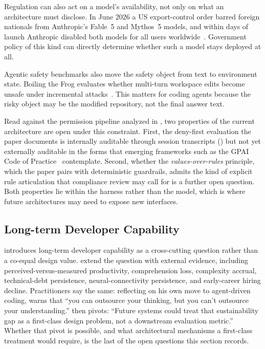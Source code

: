 \tierA{} Regulation can also act on a model's availability, not only on what an architecture must disclose. In June 2026 a US export-control order barred foreign nationals from Anthropic's Fable~5 and Mythos~5 models, and within days of launch Anthropic disabled both models for all users worldwide~\citep{anthropic2026fableaccess}. Government policy of this kind can directly determine whether such a model stays deployed at all.

Agentic safety benchmarks also move the safety object from text to environment state. Boiling the Frog evaluates whether multi-turn workspace edits become unsafe under incremental attacks~\citep{bisconti2026boilingfrog}. This matters for coding agents because the risky object may be the modified repository, not the final answer text.

Read against the permission pipeline analyzed in , two properties of the current architecture are open under this constraint. First, the deny-first evaluation the paper documents is internally auditable through session transcripts () but not yet externally auditable in the forms that emerging frameworks such as the GPAI Code of Practice~\citep{eugpai2025cop} contemplate. Second, whether the \emph{values-over-rules} principle, which the paper pairs with deterministic guardrails, admits the kind of explicit rule articulation that compliance review may call for is a further open question. Both properties lie within the harness rather than the model, which is where future architectures may need to expose new interfaces.


\subsection{Long-term Developer Capability}
\label{sec:future:lens}

 introduces long-term developer capability as a cross-cutting question rather than a co-equal design value.  extend the question with external evidence, including perceived-versus-measured productivity, comprehension loss, complexity accrual, technical-debt persistence, neural-connectivity persistence, and early-career hiring decline. Practitioners say the same: reflecting on his own move to agent-driven coding, \citet{karpathy2026sequoia} warns that ``you can outsource your thinking, but you can't outsource your understanding.''  then pivots: ``Future systems could treat that sustainability gap as a first-class design problem, not a downstream evaluation metric.'' Whether that pivot is possible, and what architectural mechanisms a first-class treatment would require, is the last of the open questions this section records.

